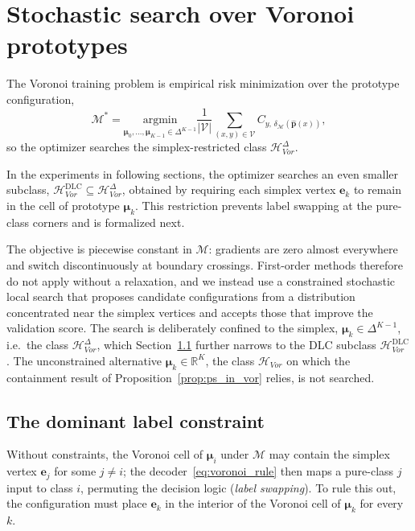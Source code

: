 \section{Stochastic search over Voronoi prototypes}

The Voronoi training problem is empirical risk minimization over the prototype configuration,
\begin{equation}
    \mathcal{M}^* = \underset{\boldsymbol{\mu}_0, \ldots, \boldsymbol{\mu}_{K-1} \in \Delta^{K-1}}{\mathrm{argmin}} \frac{1}{|\mathcal{V}|} \sum_{(x, y) \in \mathcal{V}} C_{y,\, \delta_{\mathcal{M}}(\hat{\mathbf{p}}(x))},
\end{equation}
so the optimizer searches the simplex-restricted class $\mathcal{H}_{Vor}^{\Delta}$.

In the experiments in following sections, the optimizer searches an even smaller subclass, $\mathcal{H}_{Vor}^{\mathrm{DLC}} \subseteq \mathcal{H}_{Vor}^{\Delta}$, obtained by requiring each simplex vertex $\mathbf{e}_k$ to remain in the cell of prototype $\boldsymbol{\mu}_k$. This restriction prevents label swapping at the pure-class corners and is formalized next.

The objective is piecewise constant in $\mathcal{M}$: gradients are zero almost everywhere and switch discontinuously at boundary crossings. First-order methods therefore do not apply without a relaxation, and we instead use a constrained stochastic local search that proposes candidate configurations from a distribution concentrated near the simplex vertices and accepts those that improve the validation score. The search is deliberately confined to the simplex, $\boldsymbol{\mu}_k \in \Delta^{K-1}$, i.e.\ the class $\mathcal{H}_{Vor}^{\Delta}$, which Section~\ref{sec:voronoi_dlc} further narrows to the DLC subclass $\mathcal{H}_{Vor}^{\mathrm{DLC}}$. The unconstrained alternative $\boldsymbol{\mu}_k \in \mathbb{R}^K$, the class $\mathcal{H}_{Vor}$ on which the containment result of Proposition~\ref{prop:ps_in_vor} relies, is not searched.

\subsection{The dominant label constraint}\label{sec:voronoi_dlc}
Without constraints, the Voronoi cell of $\boldsymbol{\mu}_i$ under $\mathcal{M}$ may contain the simplex vertex $\mathbf{e}_j$ for some $j \neq i$; the decoder~\eqref{eq:voronoi_rule} then maps a pure-class $j$ input to class $i$, permuting the decision logic (\textit{label swapping}). To rule this out, the configuration must place $\mathbf{e}_k$ in the interior of the Voronoi cell of $\boldsymbol{\mu}_k$ for every $k$.

